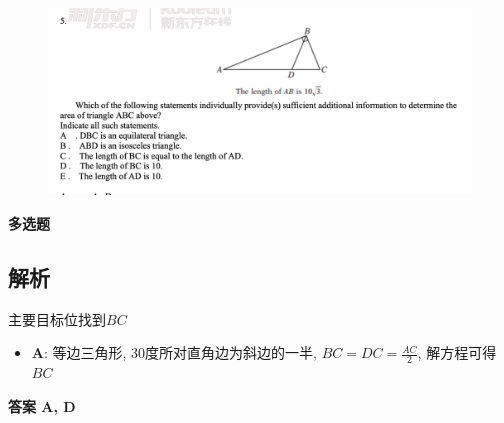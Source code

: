   \begin{figure}[H]
    \centering
    \includegraphics[width=0.7\columnwidth]{images/areas/geometry/q3}
  \end{figure}

  \textbf{多选题}

  \subsection{解析}

    主要目标位找到$ BC $

    \begin{itemize}
      \item \textbf{A}: 等边三角形, 30度所对直角边为斜边的一半,
      $ BC = DC = \frac{AC}{2} $, 解方程可得 $ BC $
    \end{itemize}

    \textbf{答案 A, D}
